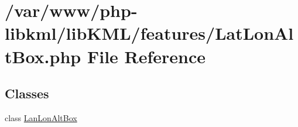 \hypertarget{LatLonAltBox_8php}{
\section{/var/www/php-\/libkml/libKML/features/LatLonAltBox.php File Reference}
\label{d9/da3/LatLonAltBox_8php}
}
\subsection*{Classes}
\begin{DoxyCompactItemize}
\item 
class \hyperlink{classLanLonAltBox}{LanLonAltBox}
\end{DoxyCompactItemize}
